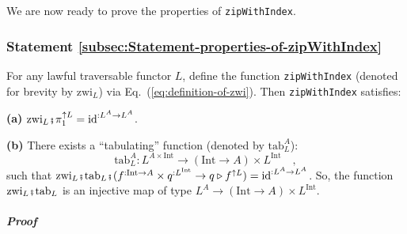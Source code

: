 We are now ready to prove the properties of \lstinline!zipWithIndex!.

\subsubsection{Statement \label{subsec:Statement-properties-of-zipWithIndex}\ref{subsec:Statement-properties-of-zipWithIndex}}

For any lawful traversable functor $L$, define the function \lstinline!zipWithIndex!
(denoted for brevity by $\text{zwi}_{L}$) via Eq.~(\ref{eq:definition-of-zwi}).
Then \lstinline!zipWithIndex! satisfies:

\textbf{(a)} $\text{zwi}_{L}\bef\pi_{1}^{\uparrow L}=\text{id}^{:L^{A}\rightarrow L^{A}}$.

\textbf{(b)} There exists a \textsf{``}tabulating\textsf{''} function (denoted by
$\text{tab}_{L}^{A}$):
\[
\text{tab}_{L}^{A}:L^{A\times\text{Int}}\rightarrow(\text{Int}\rightarrow A)\times L^{\text{Int}}\quad,
\]
such that $\text{zwi}_{L}\bef\text{tab}_{L}\bef(f^{:\text{Int}\rightarrow A}\times q^{:L^{\text{Int}}}\rightarrow q\triangleright f^{\uparrow L})=\text{id}^{:L^{A}\rightarrow L^{A}}$.
So, the function $\text{zwi}_{L}\bef\text{tab}_{L}$ is an injective
map of type $L^{A}\rightarrow(\text{Int}\rightarrow A)\times L^{\text{Int}}$.

\subparagraph{Proof}

